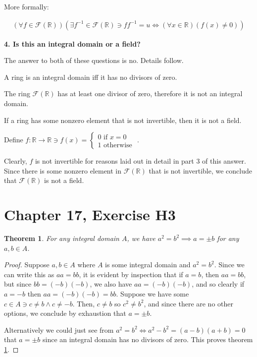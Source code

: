 \documentclass[12pt]{article}
\newcommand{\reals}{\mathbb{R}}
\newcommand{\freals}{\mathcal{F}(\reals)}
\newtheorem{thm}{Theorem}
\begin{document}
More formally:

\begin{align}
	(\forall f \in \freals)(\exists f^{-1} \in \freals \ni ff^{-1} = u \iff (\forall x \in \reals)(f(x) \neq 0))
\end{align}

\noindent
\textbf{4. Is this an integral domain or a field?}

The answer to both of these questions is no. Details follow.

A ring is an integral domain iff it has no divisors of zero.

The ring $\freals$ has at least one divisor of zero, therefore it is not an integral domain.

If a ring has some nonzero element that is not invertible, then it is not a field.

Define $f:\reals \to \reals \ni f(x) = \begin{cases} 0 \textrm{ if } x = 0 \\ 1 \textrm{ otherwise } \end{cases}$.

Clearly, $f$ is not invertible for reasons laid out in detail in part 3 of this answer.
Since there is some nonzero element in $\freals$ that is not invertible, we conclude that $\freals$ is not a field.

\section{Chapter 17, Exercise H3}

\begin{thm} \label{thm2}
	For any integral domain $A$, we have $a^2 = b^2 \implies a = \pm b$ for any $a,b \in A$.
\end{thm}

\begin{proof}
	Suppose $a,b \in A$ where $A$ is some integral domain and $a^2 = b^2$.
	Since we can write this as $aa = bb$, it is evident by inspection
	that if $a = b$, then $aa = bb$,
	but since $bb = (-b)(-b)$, we also have $aa = (-b)(-b)$,
	and so clearly if $a = -b$ then $aa = (-b)(-b) = bb$.
	Suppose we have some $c \in A \ni c \neq b \land c \neq -b$.
	Then, $c \neq b$ so $c^2 \neq b^2$,
	and since there are no other options,
	we conclude by exhaustion
	that $a = \pm b$.

	Alternatively we could just see from $a^2 = b^2 \iff a^2 - b^2 = (a - b)(a + b) = 0$
	that $a = \pm b$ since an integral domain has no divisors of zero.
	This proves theorem \ref{thm2}.
\end{proof}
\end{document}
